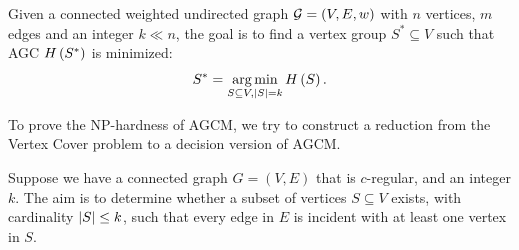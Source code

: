 \documentclass[10pt,journal,compsoc,twocolumn,twoside]{IEEEtran}
\begin{document}
\begin{problem}
Given a connected weighted undirected graph \(\mathcal{G}=(V,E,w)\) with \(n\) vertices, \(m\) edges and an integer \(k\ll n\), the goal is to find a vertex group \(S^*\subseteq V\) such that AGC \(H\left(S^*\right)\) is minimized:
\begin{equation*}
    S^*=\operatorname*{arg\,min}_{S\subseteq V,\left|S \right|=k}H\left(S\right).
\end{equation*}
\end{problem}

To prove the NP-hardness of AGCM, we try to construct a reduction from the Vertex Cover problem to a decision version of AGCM.

\begin{problem}
Suppose we have a connected graph \(G=(V,E)\) that is \(c\)-regular, and an integer \(k\). The aim is to determine whether a subset of vertices \(S\subseteq V\) exists, with cardinality \(\left|S \right|\le k\), such that every edge in \(E\) is incident with at least one vertex in \(S\).
\end{problem}
\end{document}

